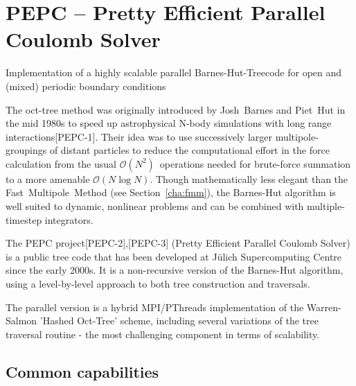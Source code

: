 \chapter{PEPC -- Pretty Efficient Parallel Coulomb Solver}
\label{cha:pepc}

\newcommand{\pepccite}[1]{\mbox{[PEPC-#1]}}
\newcommand{\algO}[1]{\ensuremath{\mathcal{O}(#1)}}


Implementation of a highly scalable parallel Barnes-Hut-Treecode for
open and (mixed) periodic boundary conditions

The oct-tree method was originally introduced by Josh~Barnes and Piet~Hut 
in the mid 1980s to speed up astrophysical N-body simulations with long 
range interactions\pepccite{1}. Their idea was to use successively 
larger multipole-groupings of distant particles to reduce the 
computational effort in the force calculation from the usual
\algO{N^2}~operations needed for brute-force summation to a more amenable 
\algO{N\log N}. Though mathematically less elegant than the 
Fast~Multipole~Method (see Section~\ref{cha:fmm}), the Barnes-Hut 
algorithm is well suited to dynamic, nonlinear problems and can be 
combined with multiple-timestep integrators.

The PEPC project\pepccite{2},\pepccite{3} (Pretty Efficient Parallel Coulomb Solver) is 
a public tree code that has been developed at J\"ulich Supercomputing Centre 
since the early 2000s. It is a non-recursive version of the Barnes-Hut 
algorithm, using a level-by-level approach to both tree construction 
and traversals. 

The parallel version is a hybrid MPI/PThreads implementation of the 
Warren-Salmon 'Hashed Oct-Tree' scheme, including several variations 
of the tree traversal routine - the most challenging component in terms of scalability.

\section*{Common capabilities}
     
